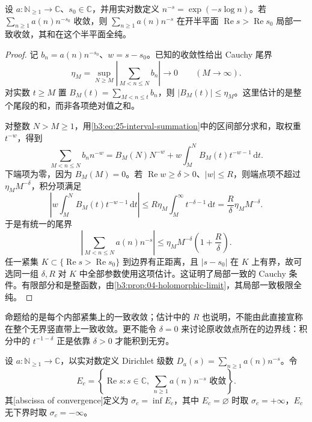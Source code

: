 \begin{proposition}[向右收敛与局部一致性]\label{b3:prop:25-convergence-half-plane}
设 \(a:\mathbb N_{\ge1}\to\mathbb C\)、\(s_0\in\mathbb C\)，并用实对数定义 \(n^{-s}=\exp(-s\log n)\)。若 \(\sum_{n\ge1}a(n)n^{-s_0}\) 收敛，则 \(\sum_{n\ge1}a(n)n^{-s}\) 在开半平面 \(\operatorname{Re}s>\operatorname{Re}s_0\) 局部一致收敛，其和在这个半平面全纯。
\end{proposition}
\begin{proof}
记 \(b_n=a(n)n^{-s_0}\)、\(w=s-s_0\)。已知的收敛性给出 Cauchy 尾界
\[
 \eta_M=\sup_{N\ge M}\left|\sum_{M<n\le N}b_n\right|
 \longrightarrow0\qquad(M\to\infty).
\]
对实数 \(t\ge M\) 置 \(B_M(t)=\sum_{M<n\le t}b_n\)，则 \(|B_M(t)|\le\eta_M\)。这里估计的是整个尾段的和，而非各项绝对值之和。

对整数 \(N>M\ge1\)，用\eqref{b3:eq:25-interval-summation}中的区间部分求和，取权重 \(t^{-w}\)，得到
\[
 \sum_{M<n\le N}b_nn^{-w}
 =B_M(N)N^{-w}
   +w\int_M^N B_M(t)t^{-w-1}\,\mathrm dt.
\]
下端项为零，因为 \(B_M(M)=0\)。若 \(\operatorname{Re}w\ge\delta>0\)、\(|w|\le R\)，则端点项不超过 \(\eta_M M^{-\delta}\)，积分项满足
\[
 \left|w\int_M^N B_M(t)t^{-w-1}\,\mathrm dt\right|
 \le R\eta_M\int_M^{\infty}t^{-\delta-1}\,\mathrm dt
 =\frac{R}{\delta}\eta_M M^{-\delta}.
\]
于是有统一的尾界
\begin{equation}\label{b3:eq:25-right-cauchy-tail}
 \left|\sum_{M<n\le N}a(n)n^{-s}\right|
 \le\eta_M M^{-\delta}\left(1+\frac R\delta\right).
\end{equation}
任一紧集 \(K\subset\{\operatorname{Re}s>\operatorname{Re}s_0\}\) 到边界有正距离，且 \(|s-s_0|\) 在 \(K\) 上有界，故可选同一组 \(\delta,R\) 对 \(K\) 中全部参数使用这项估计。这证明了局部一致的 Cauchy 条件。有限部分和是整函数，由\cref{b3:prop:04-holomorphic-limit}，其局部一致极限全纯。
\end{proof}

命题给的是每个内部紧集上的一致收敛；估计中的 \(R\) 也说明，不能由此直接宣称在整个无界竖直带上一致收敛。更不能令 \(\delta=0\) 来讨论原收敛点所在的边界线：积分中的 \(t^{-1-\delta}\) 正是依靠 \(\delta>0\) 才能积到无穷。

\begin{definition}[收敛横坐标]\label{b3:def:25-convergence-abscissa}
设 \(a:\mathbb N_{\ge1}\to\mathbb C\)，以实对数定义 Dirichlet 级数 \(D_a(s)=\sum_{n\ge1}a(n)n^{-s}\)。令
\[
 E_c=\left\{\operatorname{Re}s:
       s\in\mathbb C,\ \sum_{n\ge1}a(n)n^{-s}\text{ 收敛}\right\}.
\]
其[abscissa of convergence]定义为 \(\sigma_c=\inf E_c\)，其中 \(E_c=\varnothing\) 时取 \(\sigma_c=+\infty\)，\(E_c\) 无下界时取 \(\sigma_c=-\infty\)。
\end{definition}

